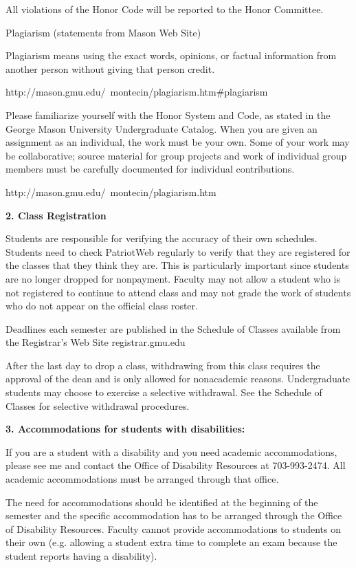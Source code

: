 \documentclass[11pt]{article}
\begin{document}
All violations of the Honor Code will be reported to the Honor Committee.

Plagiarism (statements from Mason Web Site)

Plagiarism means using the exact words, opinions, or factual information from another person without giving that person credit.

http://mason.gmu.edu/~montecin/plagiarism.htm\#plagiarism
 
Please familiarize yourself with the Honor System and Code, as stated in the George Mason University Undergraduate Catalog. When you are given an assignment as an individual, the work must be your own. Some of your work may be collaborative; source material for group projects and work of individual group members must be carefully documented for individual contributions.

http://mason.gmu.edu/~montecin/plagiarism.htm
 
\textbf{2. Class Registration}
 
Students are responsible for verifying the accuracy of their own schedules. Students need to check PatriotWeb regularly to verify that they are registered for the classes that they think they are. This is particularly important since students are no longer dropped for nonpayment.
 Faculty may not allow a student who is not registered to continue to attend class and may not grade the work of students who do not appear on the official class roster.

Deadlines each semester are published in the Schedule of Classes available from the Registrar's Web Site registrar.gmu.edu

After the last day to drop a class, withdrawing from this class requires the approval of the dean and is only allowed for nonacademic reasons.
 Undergraduate students may choose to exercise a selective withdrawal. See the Schedule of Classes for selective withdrawal procedures.

\textbf{3. Accommodations for students with disabilities:}
 
If you are a student with a disability and you need academic accommodations, please see me and contact the Office of Disability Resources at 703-993-2474. All academic accommodations must be arranged through that office.
 
The need for accommodations should be identified at the beginning of the semester and the specific accommodation has to be arranged through the Office of Disability Resources. Faculty cannot provide accommodations to students on their own (e.g. allowing a student extra time to complete an exam because the student reports having a disability).
\end{document}
